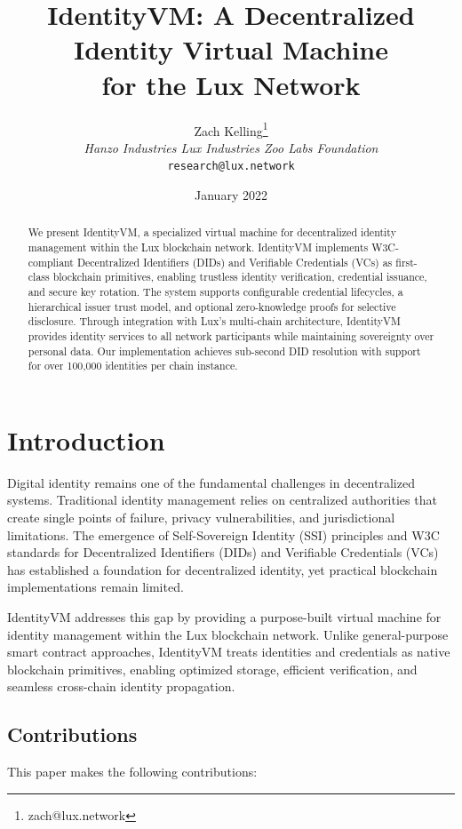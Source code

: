 \documentclass[11pt,twocolumn]{article}
\title{IdentityVM: A Decentralized Identity Virtual Machine\\for the Lux Network}
\author{Zach Kelling\thanks{zach@lux.network} \\ \textit{Hanzo Industries \quad Lux Industries \quad Zoo Labs Foundation} \\ \texttt{research@lux.network}}
\date{January 2022}
\begin{document}
\maketitle

\begin{abstract}
We present IdentityVM, a specialized virtual machine for decentralized identity management within the Lux blockchain network. IdentityVM implements W3C-compliant Decentralized Identifiers (DIDs) and Verifiable Credentials (VCs) as first-class blockchain primitives, enabling trustless identity verification, credential issuance, and secure key rotation. The system supports configurable credential lifecycles, a hierarchical issuer trust model, and optional zero-knowledge proofs for selective disclosure. Through integration with Lux's multi-chain architecture, IdentityVM provides identity services to all network participants while maintaining sovereignty over personal data. Our implementation achieves sub-second DID resolution with support for over 100,000 identities per chain instance.
\end{abstract}

\section{Introduction}

Digital identity remains one of the fundamental challenges in decentralized systems. Traditional identity management relies on centralized authorities that create single points of failure, privacy vulnerabilities, and jurisdictional limitations. The emergence of Self-Sovereign Identity (SSI) principles and W3C standards for Decentralized Identifiers (DIDs) \cite{did-core} and Verifiable Credentials (VCs) \cite{vc-data-model} has established a foundation for decentralized identity, yet practical blockchain implementations remain limited.

IdentityVM addresses this gap by providing a purpose-built virtual machine for identity management within the Lux blockchain network. Unlike general-purpose smart contract approaches, IdentityVM treats identities and credentials as native blockchain primitives, enabling optimized storage, efficient verification, and seamless cross-chain identity propagation.

\subsection{Contributions}

This paper makes the following contributions:
\end{document}
